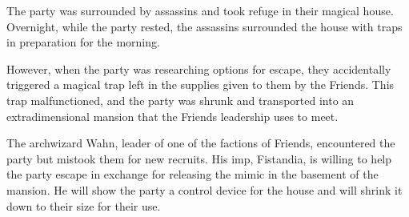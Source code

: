 The party was surrounded by assassins and took refuge in their magical house.
Overnight, while the party rested, the assassins surrounded the house with traps in preparation for the morning.

However, when the party was researching options for escape, they accidentally triggered a magical trap left in the supplies given to them by the Friends.
This trap malfunctioned, and the party was shrunk and transported into an extradimensional mansion that the Friends leadership uses to meet.

The archwizard Wahn, leader of one of the factions of Friends, encountered the party but mistook them for new recruits.
His imp, Fistandia, is willing to help the party escape in exchange for releasing the mimic in the basement of the mansion.
He will show the party a control device for the house and will shrink it down to their size for their use.
